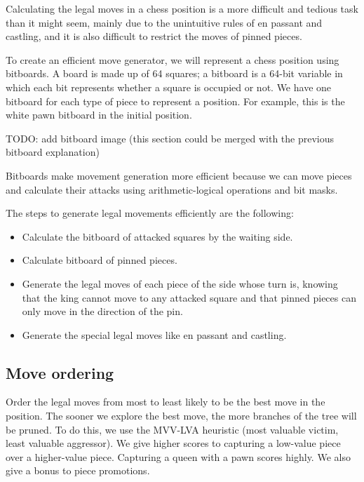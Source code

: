 Calculating the legal moves in a chess position is a more difficult and tedious task than it might seem, mainly due to the unintuitive rules of en passant and castling, and it is also difficult to restrict the moves of pinned pieces.

\vspace{1em}

To create an efficient move generator, we will represent a chess position using bitboards. A board is made up of 64 squares; a bitboard is a 64-bit variable in which each bit represents whether a square is occupied or not. We have one bitboard for each type of piece to represent a position. For example, this is the white pawn bitboard in the initial position.

\vspace{1em}

TODO: add bitboard image (this section could be merged with the previous bitboard explanation)

\vspace{1em}

\noindent Bitboards make movement generation more efficient because we can move pieces and calculate their attacks using arithmetic-logical operations and bit masks.

\vspace{1em}

The steps to generate legal movements efficiently are the following:

\begin{itemize}
  \item Calculate the bitboard of attacked squares by the waiting side.
  \item Calculate bitboard of pinned pieces.
  \item Generate the legal moves of each piece of the side whose turn is, knowing that the king cannot move to any attacked square and that pinned pieces can only move in the direction of the pin.
  \item Generate the special legal moves like en passant and castling.
\end{itemize}

\subsection{Move ordering}

Order the legal moves from most to least likely to be the best move in the position. The sooner we explore the best move, the more branches of the tree will be pruned. To do this, we use the MVV-LVA heuristic (most valuable victim, least valuable aggressor). We give higher scores to capturing a low-value piece over a higher-value piece. Capturing a queen with a pawn scores highly. We also give a bonus to piece promotions.


